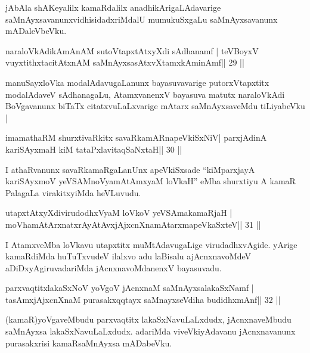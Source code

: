 \begin{artha}
jAbAla shAKeyalilx kamaRdalilx anadhikArigaLAdavarige saMnAyxsavanunx\break vidhisidadxriMdalU mumukuSxgaLu saMnAyxsavanunx mADaleVbeVku.
\end{artha}

\begin{shl}
naraloVkAdikAmAnAM sutoVtapxtAtxyXdi sAdhanamf |
teVBoyxV vuyxtithxtacitAtxnAM saMnAyxsasAtxvXtamxkAminAmf\hfill || 29 ||
\end{shl}

\begin{artha}
manuSayxloVka modalAdavugaLanunx bayasuvavarige putorxVtapxtitx
modalA\-daveV sAdhanagaLu, AtamxvanenxV bayasuva matutx naraloVkAdi
BoVgavanunx biTaTx citatxvuLaLxvarige mAtarx saMnAyxsaveMdu
tiLiyabeVku |
\end{artha}

\begin{shl}
imamathaRM shurxtivaRkitx savaRkamARnapeVkiSxNiV|
parxjAdinA kariSAyxmaH kiM tataPxlavitaqSaNxtaH\hfill || 30 ||
\end{shl}

\begin{artha}
I athaRvanunx savaRkamaRgaLanUnx apeVkiSxsade ``kiMparxjayA kariSAyxmoV yeVSAMnoV\s yamAtAmxyaM loVkaH'' eMba shurxtiyu A kamaR PalagaLa virakitxyiMda heVLuvudu.
\end{artha}


\begin{shl}
utapxtAtxyXdivirudodhxV\s yaM loVkoV yeVSAmakamaRjaH |
moVhamAtArxnatxrAyAtAvxjAjxcnXnamAtarxmapeVkaSxteV\hfill || 31 ||
\end{shl}

\begin{artha}
I AtamxveMba loVkavu utapxtitx muMtAdavugaLige virudadhxvAgide. yArige kamaRdiMda huTuTxvudeV ilalxvo adu laBisalu ajAcnxnavoMdeV aDiDxyAgiruvadariMda jAcnxnavoMdanenxV bayasuvadu.
\end{artha}


\begin{shl}
parxvaqtitxlakaSxNoV yoVgoV jAcnxnaM saMnAyxsalakaSxNamf |
tasAmxjAjxcnXnaM purasakxqqtayx saMnayxseVdiha budidhxmAnf\hfill || 32 ||
\end{shl}

\begin{artha}
(kamaR)yoVgaveMbudu parxvaqtitx lakaSxNavuLaLxdudx, jAcnxnaveMbudu
 saMnAyxsa lakaSxNavuLaLxdudx. adariMda viveVkiyAdavanu jAcnxnavanunx
 purasakxrisi kamaRsaMnAyxsa mADabeVku.
\end{artha}

